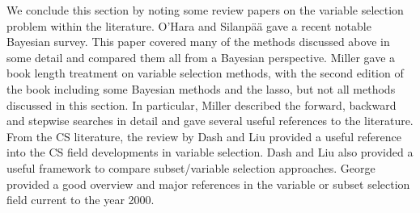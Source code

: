  We conclude this section by noting some review papers on the variable selection problem within the literature. O'Hara and Silanp\"{a}\"{a} \cite{o2009review} gave a recent notable Bayesian survey. This paper covered many of the methods discussed above in some detail and compared them all from a Bayesian perspective. Miller \cite{miller2002subset} gave a book length treatment on variable selection methods, with the second edition of the book including some Bayesian methods and the lasso, but not all methods discussed in this section. In particular, Miller \cite{miller2002subset} described the forward, backward and stepwise searches in detail and gave several useful references to the literature. From the CS literature, the review by Dash and Liu  \cite{dash1997feature} provided a useful reference into the CS field developments in variable selection. Dash and Liu \cite{dash1997feature} also provided a useful framework to compare subset/variable selection approaches. George \cite{george2000variable} provided a good overview and major references in the variable or subset selection field current to the year 2000.     
 